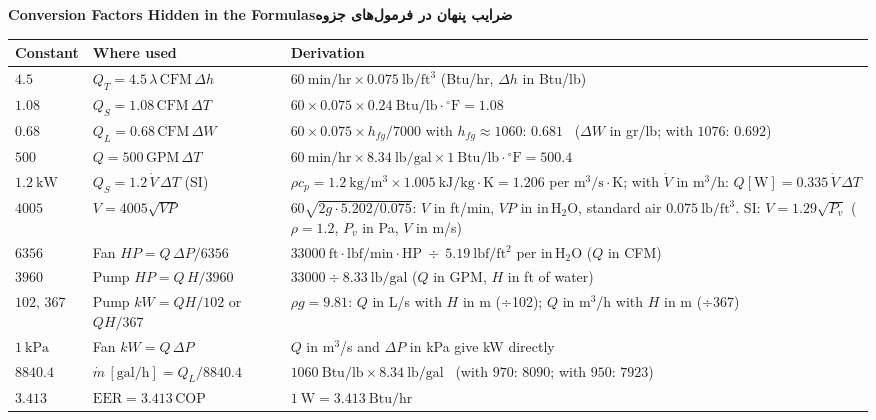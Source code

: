\documentclass[9pt]{extarticle}
\renewcommand{\arraystretch}{1.1}
\newcommand{\fa}[1]{{\farsifont\beginR #1\endR}}
\newcommand{\sect}[2]{\par\Needspace{8\baselineskip}\vspace{3pt}\noindent\colorbox{hdr}{\parbox{\dimexpr\linewidth-2\fboxsep}{\bfseries #1\hfill\fa{\bfseries #2}}}\par\vspace{2pt}}
\begin{document}
\clearpage
\sect{Conversion Factors Hidden in the Formulas}{ضرایب پنهان در فرمول‌های جزوه}
{\convfont\renewcommand{\arraystretch}{1.35}\setlength{\tabcolsep}{4pt}
\noindent\begin{tabular}{@{}p{2.3cm}p{5.8cm}p{9.3cm}@{}}\toprule
\rowcolor{hdr}\textbf{Constant} & \textbf{Where used} & \textbf{Derivation}\\ \midrule
$4.5$ & $Q_T=4.5\,\lambda\,\mathrm{CFM}\,\Delta h$ & $60\ \mathrm{min/hr}\times0.075\ \mathrm{lb/ft^3}$ \quad (Btu/hr, $\Delta h$ in Btu/lb)\\
\rowcolor{zebra}$1.08$ & $Q_S=1.08\,\mathrm{CFM}\,\Delta T$ & $60\times0.075\times0.24\ \mathrm{Btu/lb\cdot{}^\circ F}=1.08$\\
$0.68$ & $Q_L=0.68\,\mathrm{CFM}\,\Delta W$ & $60\times0.075\times h_{fg}/7000$ with $h_{fg}\approx1060$: $0.681$ \ ($\Delta W$ in gr/lb; with $1076$: $0.692$)\\
\rowcolor{zebra}$500$ & $Q=500\,\mathrm{GPM}\,\Delta T$ & $60\ \mathrm{min/hr}\times8.34\ \mathrm{lb/gal}\times1\ \mathrm{Btu/lb\cdot{}^\circ F}=500.4$\\
$1.2\ \mathrm{kW}$ & $Q_S=1.2\,\dot V\,\Delta T$ (SI) & $\rho c_p=1.2\ \mathrm{kg/m^3}\times1.005\ \mathrm{kJ/kg\cdot K}=1.206$ per $\mathrm{m^3/s\cdot K}$; with $\dot V$ in $\mathrm{m^3/h}$: $Q[\mathrm{W}]=0.335\,\dot V\,\Delta T$\\
\rowcolor{zebra}$4005$ & $V=4005\sqrt{VP}$ & $60\sqrt{2g\cdot5.202/0.075}$: $V$ in ft/min, $VP$ in in\,H$_2$O, standard air $0.075\ \mathrm{lb/ft^3}$. SI: $V=1.29\sqrt{P_v}$ ($\rho=1.2$, $P_v$ in Pa, $V$ in m/s)\\
$6356$ & Fan $HP=Q\,\Delta P/6356$ & $33000\ \mathrm{ft\cdot lbf/min\cdot HP}\ \div\ 5.19\ \mathrm{lbf/ft^2}$ per in\,H$_2$O ($Q$ in CFM)\\
\rowcolor{zebra}$3960$ & Pump $HP=Q\,H/3960$ & $33000\div8.33\ \mathrm{lb/gal}$ ($Q$ in GPM, $H$ in ft of water)\\
$102$, $367$ & Pump $kW=QH/102$ or $QH/367$ & $\rho g=9.81$: $Q$ in L/s with $H$ in m (÷102); $Q$ in m$^3$/h with $H$ in m (÷367)\\
\rowcolor{zebra}$1\ \mathrm{kPa}$ & Fan $kW=Q\,\Delta P$ & $Q$ in m$^3$/s and $\Delta P$ in kPa give kW directly\\
$8840.4$ & $\dot m\,[\mathrm{gal/h}]=Q_L/8840.4$ & $1060\ \mathrm{Btu/lb}\times8.34\ \mathrm{lb/gal}$ \ (with $970$: $8090$; with $950$: $7923$)\\
\rowcolor{zebra}$3.413$ & $\mathrm{EER}=3.413\,\mathrm{COP}$ & $1\ \mathrm{W}=3.413\ \mathrm{Btu/hr}$\\

\end{tabular}}
\end{document}
